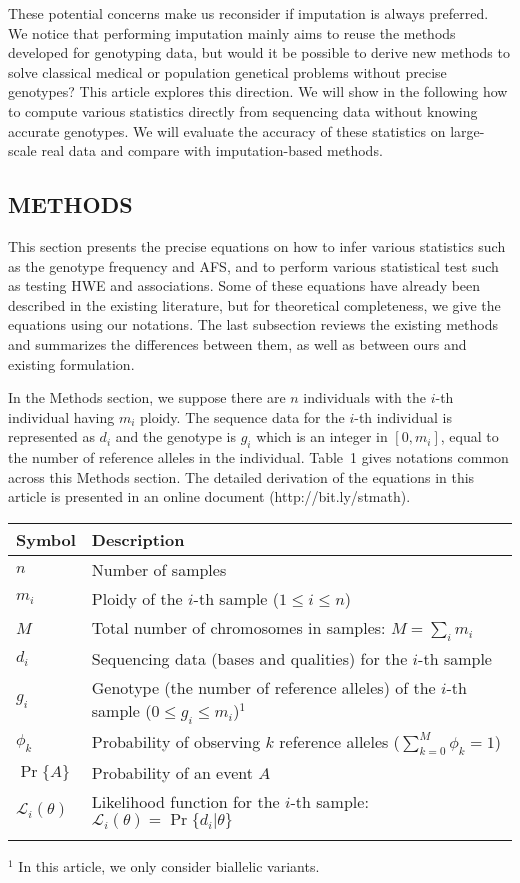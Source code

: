 \documentclass{bioinfo}
\begin{document}
These potential concerns make us reconsider if imputation is always preferred. We notice that performing imputation
mainly aims to reuse the methods developed for genotyping data,
but would it be possible to derive new methods to solve classical medical or population genetical
problems without precise genotypes? This article explores this direction. We will show
in the following how to compute various statistics directly from sequencing data without
knowing accurate genotypes. We will evaluate the accuracy of these statistics on large-scale
real data and compare with imputation-based methods.

\begin{methods}
\section{METHODS}
This section presents the precise equations on how to infer various statistics such as
the genotype frequency and AFS, and to perform various statistical test such as
testing HWE and associations. Some of these equations have already been described
in the existing literature, but for theoretical completeness, we give the equations
using our notations. The last subsection reviews the existing methods and summarizes
the differences between them, as well as between ours and existing formulation.

In the Methods section, we suppose there are $n$ individuals with the $i$-th
individual having $m_i$ ploidy. The sequence data for the $i$-th individual is
represented as $d_i$ and the genotype is $g_i$ which is an integer in $[0,m_i]$,
equal to the number of reference alleles in the individual.
Table~1 %
gives notations common across this Methods section. The detailed derivation of
the equations in this article is presented in an online document (http://bit.ly/stmath).

\begin{table}[!htb]\label{tab:notation}
{\begin{tabular}{lp{7cm}}
\toprule
Symbol & Description \\
\midrule
$n$ & Number of samples \\
$m_i$ & Ploidy of the $i$-th sample ($1\le i\le n$)\\
$M$ & Total number of chromosomes in samples: $M=\sum_i m_i$\\
$d_i$ & Sequencing data (bases and qualities) for the $i$-th sample\\
$g_i$ & Genotype (the number of reference alleles) of the $i$-th sample \mbox{($0\le g_i\le m_i$)}$^1$\\
$\phi_k$ & Probability of observing $k$ reference alleles ($\sum_{k=0}^M\phi_k=1$) \\
$\Pr\{A\}$ & Probability of an event $A$\\
$\mathcal{L}_i(\theta)$ & Likelihood function for the $i$-th sample: $\mathcal{L}_i(\theta)=\Pr\{d_i|\theta\}$ \\
\botrule
\end{tabular}}{$^1$ In this article, we only consider biallelic variants.}
\end{table}


\end{methods}
\end{document}
